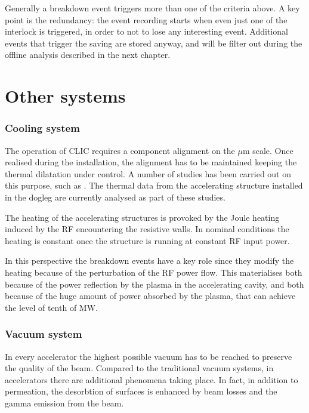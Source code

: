 Generally a breakdown event triggers more than one of the criteria above. A key point is the redundancy: the event recording starts when even just one of the interlock is triggered, in order to not to lose any interesting event. Additional events that trigger the saving are stored anyway, and will be filter out during the offline analysis described in the next chapter.


\section[Other systems]{Other systems}

\subsubsection{Cooling system}

The operation of CLIC requires a component alignment on the $\mu$m scale. Once realised during the installation, the alignment has to be maintained keeping the thermal dilatation under control. A number of studies has been carried out on this purpose, such as \cite{Daskalaki:2141828}. The thermal data from the accelerating structure installed in the dogleg are currently analysed as part of these studies.

The heating of the accelerating structures is provoked by the Joule heating induced by the RF encountering the resistive walls. In nominal conditions the heating is constant once the structure is running at constant RF input power. 

In this perspective the breakdown events have a key role since they modify the heating because of the perturbation of the RF power flow. This materialises both because of the power reflection by the plasma in the accelerating cavity, and both because of the huge amount of power absorbed by the plasma, that can achieve the level of tenth of MW.


\subsubsection{Vacuum system}

In every accelerator the highest possible vacuum has to be reached to preserve the quality of the beam. Compared to the traditional vacuum systems, in accelerators there are additional phenomena taking place. In fact, in addition to permeation, the desorbtion of surfaces is enhanced by beam losses and the gamma emission from the beam. 

